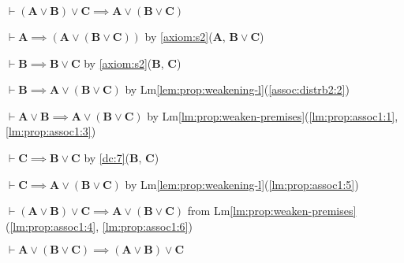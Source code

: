 \documentclass{amsart}%
\newcommand\metavariable[1]{\boldsymbol{#1}}
\begin{document}
\begin{lemma}\label{lm:prop:assoc1}
$\vdash(\metavariable{A}\lor\metavariable{B})\lor\metavariable{C}\implies\metavariable{A}\lor(\metavariable{B}\lor\metavariable{C})$
\end{lemma}
\begin{pf}
\item\label{lm:prop:assoc1:1} $\vdash\metavariable{A}\implies(\metavariable{A}\lor(\metavariable{B}\lor\metavariable{C}))$
  by \ref{axiom:s2}($\metavariable{A}$, $\metavariable{B}\lor\metavariable{C}$)
\item\label{assoc:distrb2:2} $\vdash\metavariable{B}\implies\metavariable{B}\lor\metavariable{C}$
  by \ref{axiom:s2}($\metavariable{B}$, $\metavariable{C}$)
\item\label{lm:prop:assoc1:3} $\vdash\metavariable{B}\implies\metavariable{A}\lor(\metavariable{B}\lor\metavariable{C})$
  by Lm\ref{lem:prop:weakening-l}(\ref{assoc:distrb2:2})
\item\label{lm:prop:assoc1:4} $\vdash\metavariable{A}\lor\metavariable{B}\implies\metavariable{A}\lor(\metavariable{B}\lor\metavariable{C})$
  by Lm\ref{lm:prop:weaken-premises}(\ref{lm:prop:assoc1:1}, \ref{lm:prop:assoc1:3})
\item\label{lm:prop:assoc1:5} $\vdash\metavariable{C}\implies\metavariable{B}\lor\metavariable{C}$
  by \ref{dc:7}($\metavariable{B}$, $\metavariable{C}$)
\item\label{lm:prop:assoc1:6} $\vdash\metavariable{C}\implies\metavariable{A}\lor(\metavariable{B}\lor\metavariable{C})$
  by Lm\ref{lem:prop:weakening-l}(\ref{lm:prop:assoc1:5})
\item $\vdash(\metavariable{A}\lor\metavariable{B})\lor\metavariable{C}\implies\metavariable{A}\lor(\metavariable{B}\lor\metavariable{C})$
  from Lm\ref{lm:prop:weaken-premises}(\ref{lm:prop:assoc1:4}, \ref{lm:prop:assoc1:6})
\end{pf}

\begin{lemma}\label{lemma:prop:disj-assoc2}
$\vdash\metavariable{A}\lor(\metavariable{B}\lor\metavariable{C})\implies(\metavariable{A}\lor\metavariable{B})\lor\metavariable{C}$
\end{lemma}
\end{document}
